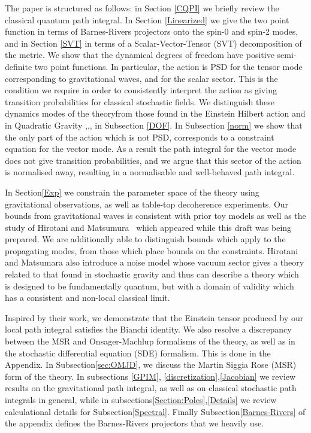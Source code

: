 \documentclass[aps,preprintnumbers,superscriptaddress,longbibliography]{revtex4-1}
\begin{document}
The paper is structured as follows: in Section \ref{CQPI} we briefly review the classical quantum path integral. In Section \ref{Linearized} we give the two point function in terms of Barnes-Rivers projectors onto the spin-0 and spin-2 modes, and in Section \ref{SVT}  in terms of a Scalar-Vector-Tensor (SVT) decomposition of the metric. We show that the dynamical degrees of freedom have positive semi-definite two point functions. In particular, the action is PSD for the tensor mode corresponding to gravitational waves, and for the scalar sector. This is the condition we require in order to consistently interpret the action as giving transition probabilities for classical stochastic fields. We distinguish these dynamics modes of the theoryfrom those found in the Einstein Hilbert action and in Quadratic Gravity \cite{stelle1977renormalization},\cite{salvio2018quadratic},\cite{alvarez-gaume2016aspects},\cite{hell2023degreesfreedomr2gravity} in Subsection \ref{DOF}. In Subsection \ref{norm} we show that the only part of the action which is not PSD, corresponds to a constraint equation for the vector mode. As a result the path integral for the vector mode does not give transition probabilities, and we argue that this sector of the action is normalised away, resulting in a normalisable and well-behaved path integral.

In Section\ref{Exp} we constrain the parameter space of the theory using gravitational observations, as well as table-top decoherence experiments. Our bounds from gravitational waves is consistent with prior toy models as well as the study of  
 Hirotani and Matsumura~\cite{hirotani2026testing} which appeared while this draft was being prepared. We are additionally able to distinguish bounds which apply to the propagating modes, from those which place bounds on the constraints.
 Hirotani and Matsumara also introduce a noise model whose vacuum sector gives a theory related to that found in stochastic gravity\cite{hu2008stochastic,moffat1997stochastic} and thus can describe a theory which is designed to be fundamentally quantum, but with a domain of validity which has a consistent and non-local classical limit. 

 Inspired by their work, we demonstrate that the Einstein tensor produced by our local path integral satisfies the Bianchi identity. We also  
 resolve a discrepancy between the MSR and Onsager-Machlup formalisms of the theory, as well as in the stochastic differential equation (SDE) formalism. 
This is done in the Appendix. In Subsection\ref{sec:OMJD}, we discuss the Martin Siggia Rose (MSR) form of the theory. In subsections \ref{GPIM}, \ref{discretization},\ref{Jacobian} we review results on the gravitational path integral, as well as on classical stochastic path integrals in general, while in subsections\ref{Section:Poles},\ref{Details} we review calculational details for Subsection\ref{Spectral}. Finally Subsection\ref{Barnes-Rivers} of the appendix defines the Barnes-Rivers projectors that we heavily use. 
\end{document}

